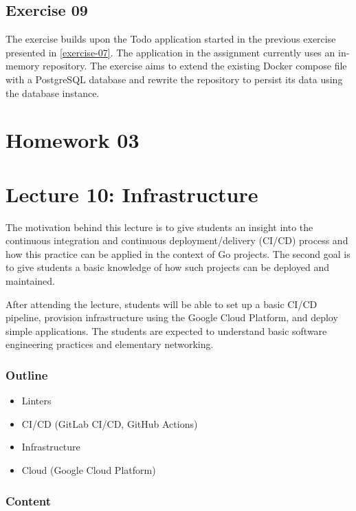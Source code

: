 \documentclass[
  digital,
  color,
  oneside,
  nosansbold,
  nocolorbold,
  nolof,
  nolot,
]{fithesis4}
\begin{document}
\subsection{Exercise 09}\label{exercise-09}

The exercise builds upon the Todo application started in the previous exercise presented in \cref{exercise-07}. The application in the assignment currently uses an in-memory repository. The exercise aims to extend the existing Docker compose file with a PostgreSQL\cite{postgres} database and rewrite the repository to persist its data using the database instance.

\section{Homework 03}

\section{Lecture 10: Infrastructure}\label{lecture-infrastructure}

The motivation behind this lecture is to give students an insight into the continuous integration and continuous deployment/delivery (CI/CD) process and how this practice can be applied in the context of Go projects. The second goal is to give students a basic knowledge of how such projects can be deployed and maintained.

After attending the lecture, students will be able to set up a basic CI/CD pipeline, provision infrastructure using the Google Cloud Platform, and deploy simple applications. The students are expected to understand basic software engineering practices and elementary networking.

\subsubsection{Outline}

\begin{itemize}
    \item Linters
    \item CI/CD (GitLab CI/CD, GitHub Actions)
    \item Infrastructure
    \item Cloud (Google Cloud Platform)
\end{itemize}

\subsubsection{Content}
\end{document}
